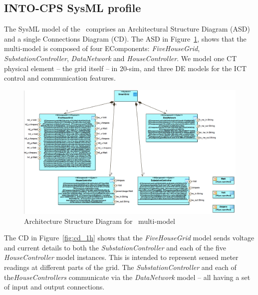\subsection{INTO-CPS SysML profile}
\label{sec:smartgrid_into_sys}

The SysML model of the \SG\ comprises an Architectural Structure Diagram (ASD) and a single Connections Diagram (CD). The ASD in Figure~\ref{fig:asd_1h}, shows that the multi-model is composed of four EComponents: \emph{FiveHouseGrid},  \emph{SubstationController},  \emph{DataNetwork} and  \emph{HouseController}. We model one CT physical element -- the grid itself -- in 20-sim, and three DE models for the ICT control and communication features.

\begin{figure}[htbp]
\begin{center}
\includegraphics[width=1\textwidth]{smartgrid/5house_asd.png}
\caption{Architecture Structure Diagram for \SG\ multi-model}
\label{fig:asd_1h}
\end{center}
\end{figure}

The CD in Figure~\ref{fig:cd_1h} shows that the  \emph{FiveHouseGrid} model sends voltage and current details to both the \emph{SubstationController} and each of the five \emph{HouseController} model instances. This is intended to represent sensed meter readings at different parts of the grid. The \emph{SubstationController} and  each of the\emph{HouseControllers} communicate via the  \emph{DataNetwork} model -- all having a set of input and output connections.

